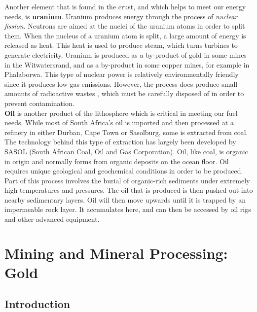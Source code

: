 Another element that is found in the crust, and which helps to meet our energy needs, is \textbf{uranium}. Uranium produces energy through the process of \textit{nuclear fission}. Neutrons are aimed at the nuclei of the uranium atoms in order to split them. When the nucleus of a uranium atom is split, a large amount of energy is released as heat. This heat is used to produce steam, which turns turbines to generate electricity. Uranium is produced as a by-product of gold in some mines in the Witwatersrand, and as a by-product in some copper mines, for example in Phalaborwa. This type of nuclear power is relatively environmentally friendly since it produces low gas emissions. However, the process does produce small amounts of radioactive wastes , which must be carefully disposed of in order to prevent contamination.\\

\textbf{Oil} is another product of the lithosphere which is critical in meeting our fuel needs. While most of South Africa's oil is imported and then processed at a refinery in either Durban, Cape Town or Sasolburg, some is extracted from coal. The technology behind this type of extraction has largely been developed by SASOL (South African Coal, Oil and Gas Corporation). Oil, like coal, is organic in origin and normally forms from organic deposits on the ocean floor. Oil requires unique geological and geochemical conditions in order to be produced. Part of this process involves the burial of organic-rich sediments under extremely high temperatures and pressures. The oil that is produced is then pushed out into nearby sedimentary layers. Oil will then move upwards until it is trapped by an impermeable rock layer. It accumulates here, and can then be accessed by oil rigs and other advanced equipment.



\clearpage
{}


\section{Mining and Mineral Processing: Gold}

\subsection{Introduction}

